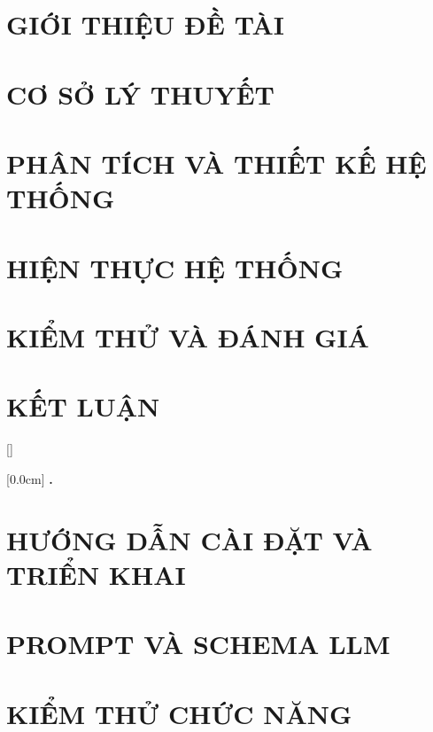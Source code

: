 \documentclass[a4paper,13pt,3p,oneside]{report}
\renewcommand{\bibname}{Danh_sach_tai_lieu_tham_khao}
\theoremstyle{definition}
\begin{document}
\chapter{GIỚI THIỆU ĐỀ TÀI}


\newpage
\chapter{CƠ SỞ LÝ THUYẾT}


\newpage
\chapter{PHÂN TÍCH VÀ THIẾT KẾ HỆ THỐNG}


\newpage
\chapter{HIỆN THỰC HỆ THỐNG}


\newpage
\chapter{KIỂM THỬ VÀ ĐÁNH GIÁ}


\newpage
\chapter{KẾT LUẬN}


\newpage
\renewcommand\bibname{TÀI LIỆU THAM KHẢO}
\printbibliography
{}

\newpage
\appendixpage
\appendix
\addappheadtotoc

[]
\titlespacing*{\chapter}{0pt}{-20pt}{20pt}

    [0.0cm]
    {\bfseries\vspace{0.3cm}}
    {{\bfseries{\scshape} \thecontentslabel.\ }}
    {}
    {\contentspage}

\chapter{HƯỚNG DẪN CÀI ĐẶT VÀ TRIỂN KHAI}


\newpage
\chapter{PROMPT VÀ SCHEMA LLM}


\newpage
\chapter{KIỂM THỬ CHỨC NĂNG}

\end{document}
